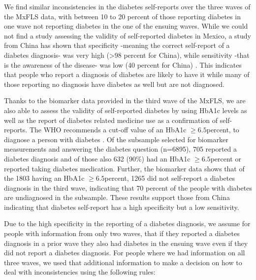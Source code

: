 We find similar inconsistencies in the diabetes self-reports over
the three waves of the \ac{MxFLS} data, with between 10 to 20 percent
of those reporting diabetes in one wave not reporting diabetes in
the one of the ensuing waves. While we could not find a study assessing
the validity of self-reported diabetes in Mexico, a study from China
has shown that specificity -meaning the correct self-report of a diabetes
diagnosis- was very high (>98 percent for China), while sensitivity
-that is the awareness of the disease- was low (40 percent for China)
\citep{Yuan2015a}. This indicates that people who report a diagnosis
of diabetes are likely to have it while many of those reporting no
diagnosis have diabetes as well but are not diagnosed. 

Thanks to the biomarker data provided in the third wave of the \ac{MxFLS},
we are also able to assess the validity of self-reported diabetes
by using \ac{HbA1c} levels as well as the report of diabetes related
medicine use as a confirmation of self-reports. The \ac{WHO} recommends
a cut-off value of an \ac{HbA1c} $\geqslant6.5$percent, to diagnose
a person with diabetes \citep{WorldHealthOrganization2011}. Of the
subsample selected for biomarker measurements and answering the diabetes
question (n=6895), 705 reported a diabetes diagnosis and of those
also 632 (90\%) had an \ac{HbA1c} $\geqslant6.5$percent or reported
taking diabetes medication. Further, the biomarker data shows that
of the 1803 having an \ac{HbA1c} $\geqslant6.5$percent, 1265 did
not self-report a diabetes diagnosis in the third wave, indicating
that 70 percent of the people with diabetes are undiagnosed in the
subsample. These results support those from China indicating that
diabetes self-report has a high specificity but a low sensitivity.

Due to the high specificity in the reporting of a diabetes diagnosis,
we assume for people with information from only two waves, that if
they reported a diabetes diagnosis in a prior wave they also had diabetes
in the ensuing wave even if they did not report a diabetes diagnosis.
For people where we had information on all three waves, we used that
additional information to make a decision on how to deal with inconsistencies
using the following rules:
\providecommand{\tabularnewline}{\\}

